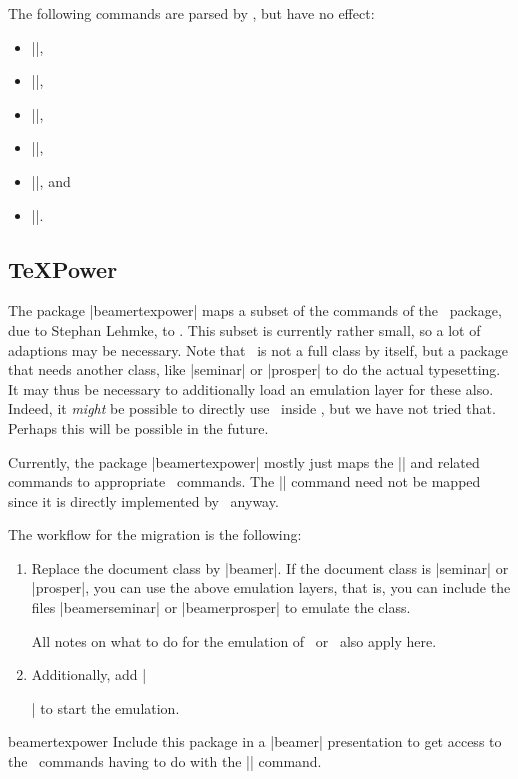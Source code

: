 The following commands are parsed by \beamer, but have no effect:
\begin{itemize}
\item |\leftheader|,
\item |\rightheader|,
\item |\leftfooter|,
\item |\rightfooter|,
\item |\Restriction|, and
\item |\marginpar|.
\end{itemize}


\subsection{\TeX Power}
\label{section-texpower}

The package |beamertexpower| maps a subset of the commands of the \texpower\ package, due to Stephan Lehmke, to \beamer. This subset is currently rather small, so a lot of adaptions may be necessary. Note that \texpower\ is not a full class by itself, but a package that needs another class, like |seminar| or |prosper| to do the actual typesetting. It may thus be necessary to additionally load an emulation layer for these also. Indeed, it \emph{might} be possible to directly use \texpower\ inside \beamer, but we have not tried that. Perhaps this will be possible in the future.

Currently, the package |beamertexpower| mostly just maps the |\stepwise| and related commands to appropriate \beamer\ commands. The |\pause| command need not be mapped since it is directly implemented by \beamer\ anyway.

The workflow for the migration is the following:
\begin{enumerate}
\item
  Replace the document class by |beamer|. If the document class is |seminar| or |prosper|, you can use the above emulation layers, that is, you can include the files |beamerseminar| or |beamerprosper| to emulate the class.

  All notes on what to do for the emulation of \seminar\ or \prosper\ also apply here.
\item
  Additionally, add |\usepackage{beamertexpower}| to start the emulation.
\end{enumerate}

\begin{package}{{beamertexpower}}
  Include this package in a |beamer| presentation to get access to the \texpower\ commands having to do with the |\stepwise| command.
\end{package}

